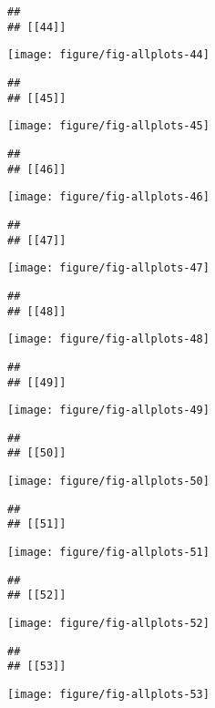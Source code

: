 \documentclass[a4]{article}\usepackage[]{graphicx}\usepackage[]{color}
\makeatletter
\def\maxwidth{ %
  \ifdim\Gin@nat@width>\linewidth
    \linewidth
  \else
    \Gin@nat@width
  \fi
}
\newenvironment{kframe}{%
 \def\at@end@of@kframe{}%
 \ifinner\ifhmode%
  \def\at@end@of@kframe{\end{minipage}}%
  \begin{minipage}{\columnwidth}%
 \fi\fi%
 \def\FrameCommand##1{\hskip\@totalleftmargin \hskip-\fboxsep
 \colorbox{shadecolor}{##1}\hskip-\fboxsep
     \hskip-\linewidth \hskip-\@totalleftmargin \hskip\columnwidth}%
 \MakeFramed {\advance\hsize-\width
   \@totalleftmargin\z@ \linewidth\hsize
   \@setminipage}}%
 {\par\unskip\endMakeFramed%
 \at@end@of@kframe}
\newenvironment{knitrout}{}{} %
\makeatother
\begin{document}
\begin{knitrout}
\begin{kframe}
\begin{verbatim}
## 
## [[44]]
\end{verbatim}
\end{kframe}
\texttt{[image: figure/fig-allplots-44]} 
\begin{kframe}\begin{verbatim}
## 
## [[45]]
\end{verbatim}
\end{kframe}
\texttt{[image: figure/fig-allplots-45]} 
\begin{kframe}\begin{verbatim}
## 
## [[46]]
\end{verbatim}
\end{kframe}
\texttt{[image: figure/fig-allplots-46]} 
\begin{kframe}\begin{verbatim}
## 
## [[47]]
\end{verbatim}
\end{kframe}
\texttt{[image: figure/fig-allplots-47]} 
\begin{kframe}\begin{verbatim}
## 
## [[48]]
\end{verbatim}
\end{kframe}
\texttt{[image: figure/fig-allplots-48]} 
\begin{kframe}\begin{verbatim}
## 
## [[49]]
\end{verbatim}
\end{kframe}
\texttt{[image: figure/fig-allplots-49]} 
\begin{kframe}\begin{verbatim}
## 
## [[50]]
\end{verbatim}
\end{kframe}
\texttt{[image: figure/fig-allplots-50]} 
\begin{kframe}\begin{verbatim}
## 
## [[51]]
\end{verbatim}
\end{kframe}
\texttt{[image: figure/fig-allplots-51]} 
\begin{kframe}\begin{verbatim}
## 
## [[52]]
\end{verbatim}
\end{kframe}
\texttt{[image: figure/fig-allplots-52]} 
\begin{kframe}\begin{verbatim}
## 
## [[53]]
\end{verbatim}
\end{kframe}
\texttt{[image: figure/fig-allplots-53]} 


\end{knitrout}
\end{document}
